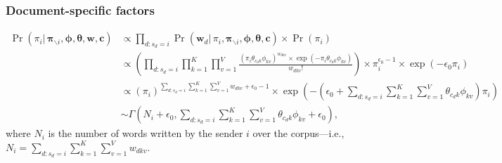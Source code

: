 \documentclass[ba]{imsart}
\numberwithin{equation}{section}
\theoremstyle{plain}
\begin{document}
	\subsubsection{Document-specific factors}
	\begin{equation}
	\begin{aligned}
	\Pr(\pi_i|\,\boldsymbol{\pi}_{\backslash i},\boldsymbol{\phi},\boldsymbol{\theta},\boldsymbol{w},\boldsymbol{c}) & \propto \prod_{d:s_d=i}\Pr(\boldsymbol{w}_d|\,\pi_{i},\boldsymbol{\pi}_{\backslash i},\boldsymbol{\phi},\boldsymbol{\theta},\boldsymbol{c}) \times \Pr(\pi_i)\\
	& \propto (\prod_{d:s_d=i}\prod_{k=1}^K\prod_{v=1}^V \frac{(\pi_{i} \theta_{c_dk}\phi_{kv})^{w_{dkv}}\times \exp(-\pi_{i} \theta_{c_dk}\phi_{kv})}{w_{dkv}!} )\times \pi_i^{\epsilon_0-1} \times \exp(-\epsilon_0 \pi_{i})\\
	&\propto (\pi_i)^{\sum_{d:s_d=i}\sum_{k=1}^K\sum_{v=1}^V w_{dkv}+\epsilon_0-1}\times \exp(-(\epsilon_0 +\sum_{d:s_d=i}\sum_{k=1}^K\sum_{v=1}^V \theta_{c_dk}\phi_{kv})\pi_{i})\\
	&	\sim \Gamma(N_{i}+\epsilon_0, \sum_{d:s_d=i}\sum_{k=1}^K\sum_{v=1}^V\theta_{c_dk} \phi_{kv}+\epsilon_0),
	\end{aligned}	
	\end{equation}
where $N_{i}$ is the number of words written by the sender $i$ over the corpus---i.e., $N_{i}=\sum_{d:s_d=i}\sum_{k=1}^K\sum_{v=1}^V w_{dkv}$.																	
\end{document}
